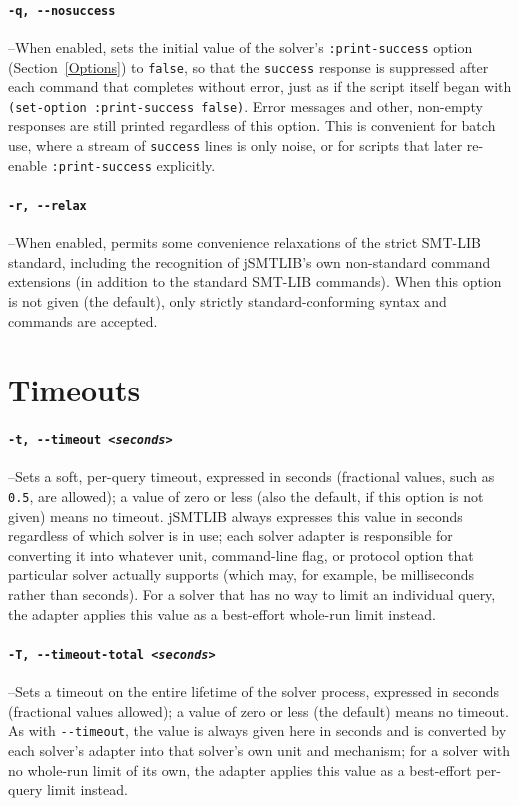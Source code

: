 \documentclass[12pt,oneside]{report}
\begin{document}
\paragraph{\tt -q, -{}-nosuccess}\label{opt:nosuccess} --When enabled, sets the initial value of the solver's {\tt :print-success} option (Section~\ref{Options}) to {\tt false}, so that the {\tt success} response is suppressed after each command that completes without error, just as if the script itself began with {\tt (set-option :print-success false)}. Error messages and other, non-empty responses are still printed regardless of this option. This is convenient for batch use, where a stream of {\tt success} lines is only noise, or for scripts that later re-enable {\tt :print-success} explicitly.

\paragraph{\tt -r, -{}-relax}\label{opt:relax} --When enabled, permits some convenience relaxations of the strict SMT-LIB standard, including the recognition of jSMTLIB's own non-standard command extensions (in addition to the standard SMT-LIB commands). When this option is not given (the default), only strictly standard-conforming syntax and commands are accepted.

\section{Timeouts}

\paragraph{\tt -t, -{}-timeout \it <seconds>}\label{opt:timeout} --Sets a soft, per-query timeout, expressed in seconds (fractional values, such as {\tt 0.5}, are allowed); a value of zero or less (also the default, if this option is not given) means no timeout. jSMTLIB always expresses this value in seconds regardless of which solver is in use; each solver adapter is responsible for converting it into whatever unit, command-line flag, or protocol option that particular solver actually supports (which may, for example, be milliseconds rather than seconds). For a solver that has no way to limit an individual query, the adapter applies this value as a best-effort whole-run limit instead.

\paragraph{\tt -T, -{}-timeout-total \it <seconds>}\label{opt:timeouttotal} --Sets a timeout on the entire lifetime of the solver process, expressed in seconds (fractional values allowed); a value of zero or less (the default) means no timeout. As with {\tt -{}-timeout}, the value is always given here in seconds and is converted by each solver's adapter into that solver's own unit and mechanism; for a solver with no whole-run limit of its own, the adapter applies this value as a best-effort per-query limit instead.
\end{document}
